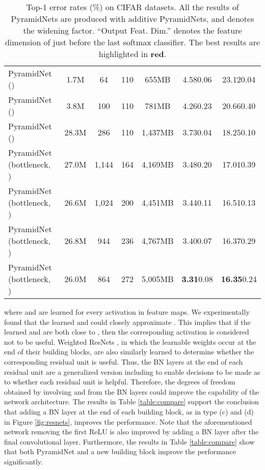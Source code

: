 \documentclass[10pt,twocolumn,letterpaper]{article}
\begin{document}
\begin{table*}[t]
\begin{center}
\begin{tabular}{|l|c|c|c|c|c|c|}
\hline
PyramidNet ()             & 1.7M  & 64  & 110 & 655MB & 4.580.06& 23.120.04\\
PyramidNet ()             & 3.8M  & 100 & 110 & 781MB & 4.260.23 & 20.660.40\\
PyramidNet ()            & 28.3M & 286 & 110 & 1,437MB & {3.73}0.04 & {18.25}0.10\\
PyramidNet (bottleneck, )& 27.0M & 1,144 & 164 & 4,169MB & {3.48}0.20 & {17.01}0.39\\
PyramidNet (bottleneck, )& 26.6M & 1,024 & 200 & 4,451MB & {3.44}0.11 & {16.51}0.13\\
PyramidNet (bottleneck, )& 26.8M & 944 & 236 & 4,767MB & {3.40}0.07 & {16.37}0.29\\
PyramidNet (bottleneck, )& 26.0M & 864 & 272 & 5,005MB & {\bf \color{red} 3.31}0.08 & {\bf \color{red} 16.35}0.24\\
\hline
\end{tabular}
\end{center}
\caption{Top-1 error rates (\%) on CIFAR datasets. All the results of PyramidNets are produced with additive PyramidNets, and  denotes the widening factor. ``Output Feat. Dim.'' denotes the feature dimension of just before the last softmax classifier. The best results are highlighted in {\bf \color{red} red}.}
\label{table:result}
\end{table*}

where  and  are learned for every activation in feature maps. We experimentally found that the learned  and  could closely approximate . This implies that if the learned  and  are both close to , then the corresponding activation is considered not to be useful. Weighted ResNets \cite{weightedresnet}, in which the learnable weights occur at the end of their building blocks, are also similarly learned to determine whether the corresponding residual unit is useful. Thus, the BN layers at the end of each residual unit are a generalized version including \cite{weightedresnet} to enable decisions to be made as to whether each residual unit is helpful. Therefore, the degrees of freedom obtained by involving  and  from the BN layers could improve the capability of the network architecture. The results in Table \ref{table:compare} support the conclusion that adding a BN layer at the end of each building block, as in type (c) and (d) in Figure \ref{fig:resnets}, improves the performance. Note that the aforementioned network removing the first ReLU is also improved by adding a BN layer after the final convolutional layer. Furthermore, the results in Table \ref{table:compare} show that both PyramidNet and a new building block improve the performance significantly.
\end{document}
